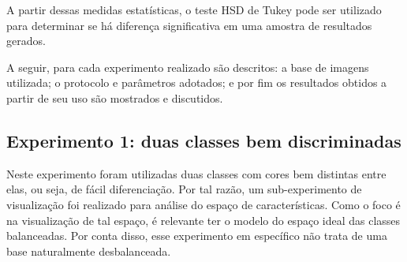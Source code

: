 A partir dessas medidas estatísticas, o teste HSD de Tukey pode ser utilizado para determinar se há diferença significativa em uma amostra de resultados gerados.



A seguir, para cada experimento realizado são descritos: a base de imagens utilizada; o protocolo e parâmetros adotados; e por fim os resultados obtidos a partir de seu uso são mostrados e discutidos.

\FloatBarrier
\subsection{Experimento 1: duas classes bem discriminadas}

Neste experimento foram utilizadas duas classes com cores bem distintas entre elas, ou seja, de fácil diferenciação. Por tal razão, um sub-experimento de visualização foi realizado para análise do espaço de características. Como o foco é na visualização de tal espaço, é relevante ter o modelo do espaço ideal das classes balanceadas. Por conta disso, esse experimento em específico não trata de uma base naturalmente desbalanceada.

